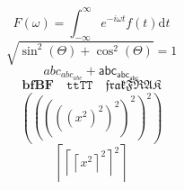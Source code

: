 \documentclass[10pt]{article}
\begin{document}
\[
  F(\omega) = \int_{-\infty}^{\infty} e^{-i\omega t} f(t) \mathrm{d} t
\]
\[
  \sqrt{\sin^2(\Theta) + \cos^2(\Theta)} = 1
\]
\[
 abc_{abc_{abc}}+\mathsf{abc_{abc_{abc}}}
\]
\[
 \mathbf{bfBF}\quad\mathtt{ttTT}\quad\mathfrak{frakFRAK}
\]
\[
  \left(\left(\left(\left(\left(x^2\right)^2\right)^2\right)^2\right)^2\right)
\]
\[
  \left\lceil \left\lceil \left\lceil x^2 \right\rceil^2 \right\rceil^2 \right\rceil
\]
\end{document}
